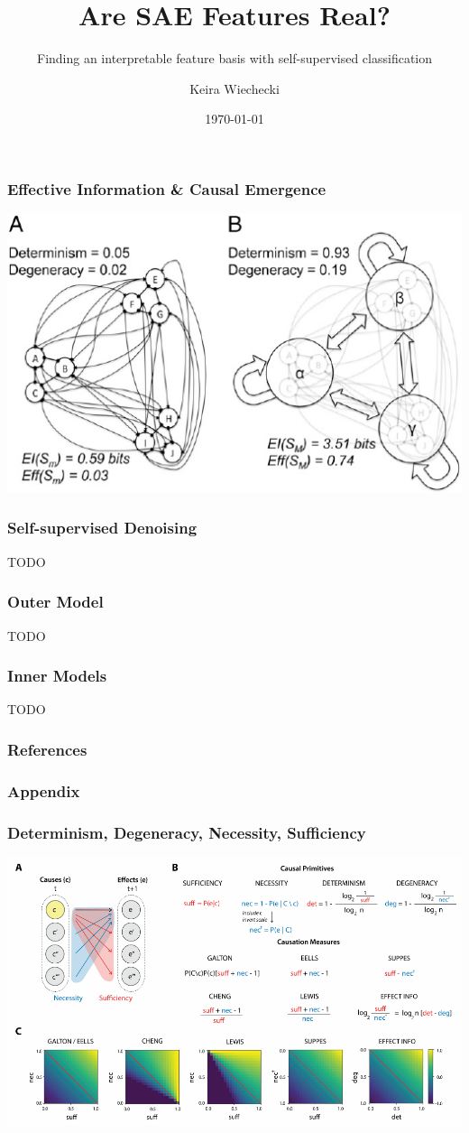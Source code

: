 \documentclass[mathserif]{beamer}
\title{Are SAE Features Real?}
\subtitle{Finding an interpretable feature basis with self-supervised classification}
\author{Keira Wiechecki}
\institute{Center for Genomics \& Systems Biology, New York University}
\date{\today}
\begin{document}
\begin{frame}
  \titlepage
\end{frame}

\begin{frame}
  \frametitle{Effective Information \& Causal Emergence}
  \includegraphics[height=0.8\textheight]{refs/hoel2013/6.pdf}
\end{frame}

\begin{frame}
  \frametitle{Self-supervised Denoising}
  TODO
\end{frame}

\begin{frame}
  \frametitle{Outer Model}
  TODO
\end{frame}

\begin{frame}
  \frametitle{Inner Models}
  TODO
\end{frame}

\begin{frame}
  \frametitle{References}
  \printbibliography
\end{frame}

\begin{frame}
  \frametitle{Appendix}
\end{frame}

\begin{frame}
  \frametitle{Determinism, Degeneracy, Necessity, Sufficiency}
  \includegraphics[height=0.8\textheight]{refs/comolatti2022/1.pdf}
\end{frame}
\end{document}
